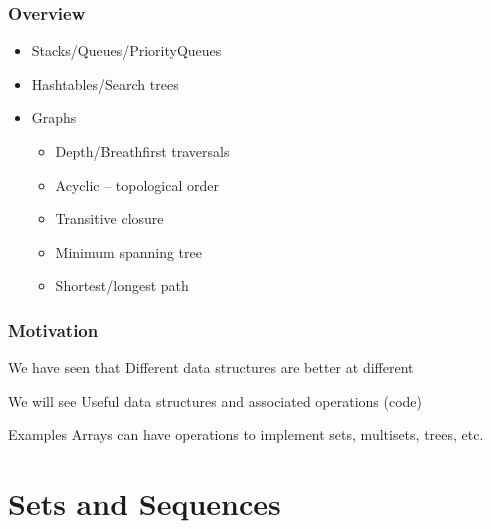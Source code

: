 \documentclass[aspectratio=169]{beamer}
\begin{document}
\frame[plain]{\titlepage}


\begin{frame}[t]\frametitle{Overview}

  \begin{itemize}
    \item Stacks/Queues/PriorityQueues  %
    \item Hashtables/Search trees
    \item Graphs
    \begin{itemize}
      \item Depth/Breathfirst traversals
      \item Acyclic -- topological order
      \item Transitive closure
      \item Minimum spanning tree
      \item Shortest/longest path
    \end{itemize}
  \end{itemize}


\end{frame}


\begin{frame}\frametitle{Motivation}
  \centering

  \begin{block}{We have seen that}
    Different \alert{data structures} are better at different 
  \end{block}

  \begin{block}{We will see}
    Useful data structures and associated operations (code)
  \end{block}

  \begin{exampleblock}{Examples}
    Arrays can have operations to implement sets, multisets, trees, etc.
  \end{exampleblock}

\end{frame}


\section{Sets and Sequences}
\end{document}
